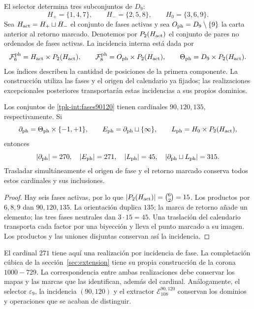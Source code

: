 El selector determina tres subconjuntos de \(D_9\):
\[
 H_+=\{1,4,7\},\qquad H_-=\{2,5,8\},\qquad H_0=\{3,6,9\}.
\]
Sea \(H_{\rm act}=H_+\sqcup H_-\) el conjunto de fases activas y
sea \(O_{\rm ph}=D_9\setminus\{9\}\) la carta anterior al retorno
marcado. Denotemos por \(P_2(H_{\rm act})\) el conjunto de pares
no ordenados de fases activas. La incidencia interna está dada por
\begin{equation}
 \mathcal F^{\rm ph}_6=H_{\rm act}\times P_2(H_{\rm act}),\qquad
 \mathcal F^{\rm ph}_8=O_{\rm ph}\times P_2(H_{\rm act}),\qquad
 \Theta_{\rm ph}=D_9\times P_2(H_{\rm act}).
 \label{tpk-int:fases90120}
\end{equation}
Los índices describen la cantidad de posiciones de la primera componente.
La construcción utiliza las fases y el origen del calendario ya fijados;
las realizaciones excepcionales posteriores transportarán estas
incidencias a sus propios dominios.

\begin{proposition}
\label{tpk-int:cardinales}
Los conjuntos de \eqref{tpk-int:fases90120} tienen cardinales
\(90,120,135\), respectivamente. Si
\[
 \partial_{\rm ph}=\Theta_{\rm ph}\times\{-1,+1\},\qquad
 E_{\rm ph}=\partial_{\rm ph}\sqcup\{\infty\},\qquad
 L_{\rm ph}=H_0\times P_2(H_{\rm act}),
\]
entonces
\[
 |\partial_{\rm ph}|=270,\quad |E_{\rm ph}|=271,\quad
 |L_{\rm ph}|=45,\quad
 |\partial_{\rm ph}\sqcup L_{\rm ph}|=315.
\]
Trasladar simultáneamente el origen de fase y el retorno marcado conserva
todos estos cardinales y sus inclusiones.
\end{proposition}
\begin{proof}
Hay seis fases activas, por lo que
\(|P_2(H_{\rm act})|=\binom62=15\). Los productos por
\(6,8,9\) dan \(90,120,135\). La orientación duplica \(135\);
la marca de retorno añade un elemento; las tres fases neutrales dan
\(3\cdot15=45\). Una traslación del calendario transporta cada
factor por una biyección y lleva el punto marcado a su imagen. Los
productos y las uniones disjuntas conservan así la incidencia.
\end{proof}

El cardinal \(271\) tiene aquí una realización por incidencia de
fase. La completación cúbica de la sección~\ref{sec:extension} tiene
su propia construcción de la corona \(1000-729\). La correspondencia
entre ambas realizaciones debe conservar los mapas y las marcas que las
identifican, además del cardinal. Análogamente, el selector
\(\varepsilon_9\), la incidencia \((90,120)\) y el extractor
\(\mathcal E_{108}^{90,120}\) conservan los dominios y operaciones
que se acaban de distinguir.

